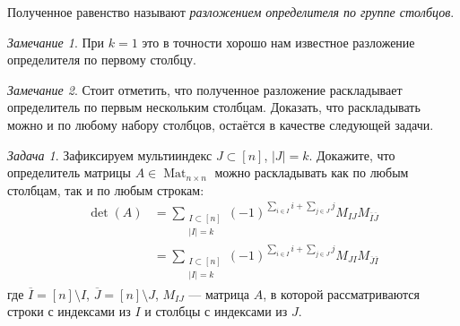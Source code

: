 \documentclass{article}
\theoremstyle{definition}
\theoremstyle{remark}
\newtheorem*{remark}{Замечание}
\newtheorem{prb}{Задача}
\newenvironment{problem}
{\begin{prb}
\label{\theprb}}
{\end{prb}}
\DeclareMathOperator{\Mat}{Mat}
\begin{document}
Полученное равенство называют \textit{разложением определителя по группе столбцов}.

\begin{remark}
    При $k = 1$ это в точности хорошо нам известное разложение определителя по первому столбцу.
\end{remark}

\begin{remark}
    Стоит отметить, что полученное разложение раскладывает определитель по первым нескольким столбцам. Доказать, что раскладывать можно и по любому набору столбцов, остаётся в качестве следующей задачи.
\end{remark}

\begin{problem}
    Зафиксируем мультииндекс $J \subset [n]$, $|J| = k$. Докажите, что определитель матрицы $A \in \Mat_{n \times n}$ можно раскладывать как по любым столбцам, так и по любым строкам:
    \begin{align*}
        \det(A) &= \sum_{\substack{I \subset [n] \\ |I| = k}} (-1)^{\sum_{i \in I} i + \sum_{j \in J} j} M_{I J} M_{\overline{I} \overline{J}} \\
        &= \sum_{\substack{I \subset [n] \\ |I| = k}} (-1)^{\sum_{i \in I} i + \sum_{j \in J} j} M_{J I} M_{\overline{J} \overline{I}}
    \end{align*}
    где $\overline{I} = [n] \setminus I$, $\overline{J} = [n] \setminus J$, $M_{I J}$ --- матрица $A$, в которой рассматриваются строки с индексами из $I$ и столбцы с индексами из $J$.
\end{problem}
\end{document}
